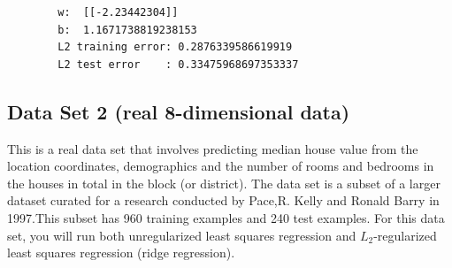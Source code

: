 \begin{enumerate}
        \begin{verbatim}
        w:  [[-2.23442304]]
        b:  1.1671738819238153
        L2 training error: 0.2876339586619919
        L2 test error    : 0.33475968697353337
        \end{verbatim}
    \end{enumerate}
    
\subsection {Data Set 2 (real 8-dimensional data)} This is a real data set that involves predicting median house value from the location coordinates, demographics and the number of rooms and bedrooms in the houses in total in the block (or district). The data set is a subset of a larger dataset curated for a research conducted by Pace,R. Kelly and Ronald Barry in 1997.This subset has 960 training examples and 240 test examples. For this data set, you will run both unregularized least squares regression and $L_2$-regularized least squares regression (ridge regression).
    
